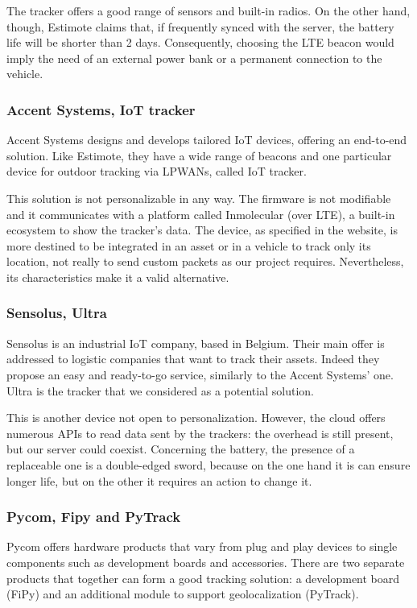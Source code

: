 The tracker offers a good range of sensors and built-in radios. On the other hand, though, Estimote claims that, if frequently synced with the server, the battery life will be shorter than 2 days. Consequently, choosing the LTE beacon would imply the need of an external power bank or a permanent connection to the vehicle.

\subsubsection{Accent Systems, IoT tracker}
Accent Systems \cite{accentsys} designs and develops tailored IoT devices, offering an end-to-end solution. Like Estimote, they have a wide range of beacons and one particular device for outdoor tracking via LPWANs, called IoT tracker.

This solution is not personalizable in any way. The firmware is not modifiable and it communicates with a platform called Inmolecular (over LTE), a built-in ecosystem to show the tracker's data. The device, as specified in the website, is more destined to be integrated in an asset or in a vehicle to track only its location, not really to send custom packets as our project requires. Nevertheless, its characteristics make it a valid alternative.

\subsubsection{Sensolus, Ultra}
Sensolus \cite{sensolus} is an industrial IoT company, based in Belgium. Their main offer is addressed to logistic companies that want to track their assets. Indeed they propose an easy and ready-to-go service, similarly to the Accent Systems' one. Ultra is the tracker that we considered as a potential solution.

This is another device not open to personalization. However, the cloud offers numerous APIs to read data sent by the trackers: the overhead is still present, but our server could coexist. Concerning the battery, the presence of a replaceable one is a double-edged sword, because on the one hand it is can ensure longer life, but on the other it requires an action to change it.

\subsubsection{Pycom, Fipy and PyTrack}
Pycom \cite{pycom} offers hardware products that vary from plug and play devices to single components such as development boards and accessories. There are two separate products that together can form a good tracking solution: a development board (FiPy) and an additional module to support geolocalization (PyTrack).

